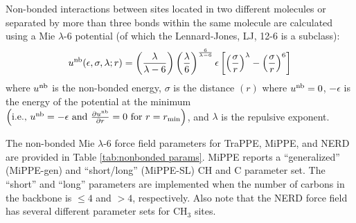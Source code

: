 \documentclass[journal=jced,manuscript=article]{achemso}
\begin{document}
    Non-bonded interactions between sites located in two different molecules or separated by more than three bonds within the same molecule are calculated using a Mie $\lambda$-6 potential (of which the Lennard-Jones, LJ, 12-6 is a subclass):
    \begin{equation} \label{eq:Mie}
    u^{\rm nb}(\epsilon,\sigma,\lambda;r) = \left(\frac{\lambda}{\lambda - 6}\right)\left(\frac{\lambda}{6}\right)^{\frac{6}{\lambda - 6}} \epsilon \left[\left(\frac{\sigma}{r}\right)^{\lambda} - \left(\frac{\sigma}{r}\right)^6\right]
    \end{equation} 
    where $u^{\rm nb}$ is the non-bonded energy, $\sigma$ is the distance $(r)$ where $u^{\rm nb} = 0$, $-\epsilon$ is the energy of the potential at the minimum $\left(\text{i.e., }u^{\rm nb} = -\epsilon \text{ and } \frac{\partial u^{\rm nb}}{\partial r} = 0 \text{ for } r=r_{\rm min} \right)$, and $\lambda$ is the repulsive exponent. 
    
    The non-bonded Mie $\lambda$-6 force field parameters for TraPPE, MiPPE, and NERD are provided in Table \ref{tab:nonbonded params}. MiPPE reports a ``generalized'' (MiPPE-gen) and ``short/long'' (MiPPE-SL) CH and C parameter set. The ``short'' and ``long'' parameters are implemented when the number of carbons in the backbone is $\le 4$ and $> 4$, respectively. Also note that the NERD force field has several different parameter sets for CH$_3$ sites.
    
\end{document}
